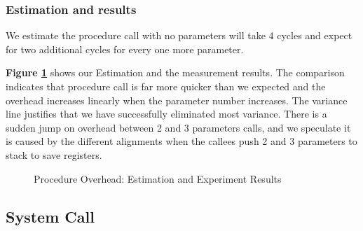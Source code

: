 
\subsubsection{Estimation and results}
We estimate the procedure call with no parameters will take 4 cycles and expect for two additional cycles for every one more parameter.

\textbf{Figure \ref{procedure_overhead_result}} shows our Estimation and the measurement results. The comparison indicates that procedure call is far more quicker than we expected and the overhead increases linearly when the parameter number increases. The variance line justifies that we have successfully eliminated most variance. There is a sudden jump on overhead between 2 and 3 parameters calls, and we speculate it is caused by the different alignments when the callees push 2 and 3
parameters to stack to save registers.


\begin{figure}[h]
    \centering
    \caption{Procedure Overhead: Estimation and Experiment Results }
    \label{procedure_overhead_result}
\end{figure}


\subsection{System Call}

